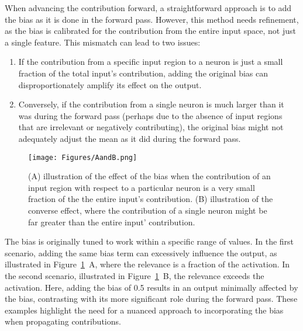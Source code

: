 
When advancing the contribution forward, a straightforward approach is to add the bias as it is done in the forward pass. However, this method needs refinement, as the bias is calibrated for the contribution from the entire input space, not just a single feature. This mismatch can lead to two issues:
\begin{enumerate}
    \item If the contribution from a specific input region to a neuron is just a small fraction of the total input's contribution, adding the original bias can disproportionately amplify its effect on the output.
    \item Conversely, if the contribution from a single neuron is much larger than it was during the forward pass (perhaps due to the absence of input regions that are irrelevant or negatively contributing), the original bias might not adequately adjust the mean as it did during the forward pass.
\end{enumerate}

\begin{figure}[ht!]
	\begin{center}
		\texttt{[image: Figures/AandB.png]}
	\end{center}
	\caption{(A) illustration of the effect of the bias when the contribution of an input region with respect to a particular neuron is a very small fraction of the the entire input's contribution. (B) illustration of the converse effect, where the contribution of a single neuron might be far greater than the entire input' contribution.}
	\label{fig:Neurons_with_bias}
\end{figure} 

The bias is originally tuned to work within a specific range of values. In the first scenario, adding the same bias term can excessively influence the output, as illustrated in Figure~\ref{fig:Neurons_with_bias}~A, where the relevance is a fraction of the activation. In the second scenario, illustrated in Figure~\ref{fig:Neurons_with_bias}~B, the relevance exceeds the activation. Here, adding the bias of 0.5 results in an output minimally affected by the bias, contrasting with its more significant role during the forward pass. These examples highlight the need for a nuanced approach to incorporating the bias when propagating contributions.

